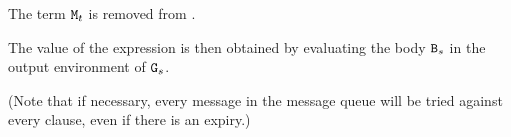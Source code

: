 \begin{itemize}
\iffalse
Each term $\TZ{M}_j$ ($1\leq j\leq n$) is matched (in that order)
against each pattern $\TZ{P}_i$ ($1\leq i\leq k$, in that
order) and (in case of a successful match) the corresponding
guard $\TZ{G}_i$ is evaluated.  The input environment of each pattern matching
is $\epsilon$ and the output environment of each matching is the
input environment of the corresponding guard.
Let $t$ be the smallest number
for which there exists a smallest number $s$ such that
$\TZ{P}_s$ matches $\TZ{M}_t$ and $\TZ{G}_s$ succeeds, if such a number $t$ exists;
otherwise evaluation of the
\T{receive} expression continues with part~3 below.
\fi

The term $\TZ{M}_t$ is removed from .

The value of the  expression is then obtained by evaluating
the body ${\tt{\sl B}}_s$ in the output environment of $\TZ{G}_s$.

(Note that if necessary, every message in the message queue will be
tried against every clause, even if there is an expiry.)


\end{itemize}
